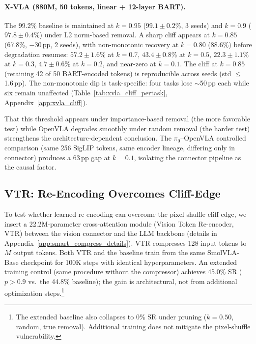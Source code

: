 \paragraph{X-VLA (880M, 50 tokens, linear + 12-layer BART).} The 99.2\% baseline is maintained at $k{=}0.95$ ($99.1 \pm 0.2$\%, 3 seeds) and $k{=}0.9$ ($97.8 \pm 0.4$\%) under L2 norm-based removal. A sharp cliff appears at $k{=}0.85$ (67.8\%, $-$30\,pp, 2 seeds), with non-monotonic recovery at $k{=}0.80$ (88.6\%) before degradation resumes: $57.2 \pm 1.6$\% at $k{=}0.7$, $43.4 \pm 0.8$\% at $k{=}0.5$, $22.3 \pm 1.1$\% at $k{=}0.3$, $4.7 \pm 0.6$\% at $k{=}0.2$, and near-zero at $k{=}0.1$. The cliff at $k{=}0.85$ (retaining 42 of 50 BART-encoded tokens) is reproducible across seeds (std $\leq$ 1.6\,pp). The non-monotonic dip is task-specific: four tasks lose $\sim$50\,pp each while six remain unaffected (Table~\ref{tab:xvla_cliff_pertask}, Appendix~\ref{app:xvla_cliff}).

That this threshold appears under importance-based removal (the more favorable test) while OpenVLA degrades smoothly under random removal (the harder test) strengthens the architecture-dependent conclusion. The $\pi_0$--OpenVLA controlled comparison (same 256 SigLIP tokens, same encoder lineage, differing only in connector) produces a 63\,pp gap at $k{=}0.1$, isolating the connector pipeline as the causal factor.

\subsection{VTR: Re-Encoding Overcomes Cliff-Edge}
\label{sec:smart_compress_results}

To test whether learned re-encoding can overcome the pixel-shuffle cliff-edge, we insert a 22.2M-parameter cross-attention module (Vision Token Re-encoder, VTR) between the vision connector and the LLM backbone (details in Appendix~\ref{app:smart_compress_details}). VTR compresses 128 input tokens to $M$ output tokens. Both VTR and the baseline train from the same SmolVLA-Base checkpoint for 100K steps with identical hyperparameters. An extended training control (same procedure without the compressor) achieves 45.0\% SR ($p > 0.9$ vs.\ the 44.8\% baseline); the gain is architectural, not from additional optimization steps.\footnote{The extended baseline also collapses to 0\% SR under pruning ($k{=}0.50$, random, true removal). Additional training does not mitigate the pixel-shuffle vulnerability.}

